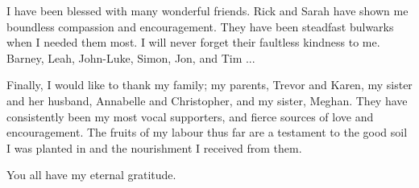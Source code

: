 \begin{acknowledgements}
{I have been blessed with many wonderful friends. Rick and Sarah have shown me 
boundless  compassion and encouragement. They have been steadfast bulwarks when I 
needed them most. I will never forget their faultless kindness to me. Barney, Leah, 
John-Luke, Simon, Jon, and Tim ...

Finally, I would like to thank my family; my parents, Trevor and Karen, my 
sister and her husband, Annabelle and Christopher, and my sister, Meghan. They
have  consistently been my most vocal supporters, and fierce sources of love and
encouragement. The fruits of my labour thus far are a testament to the good 
soil I was planted in and the nourishment I received from them.

You all have my eternal gratitude.}

\end{acknowledgements}
